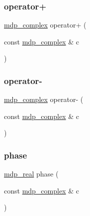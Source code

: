 \mbox{\label{classmdp__complex_addd8f88607b984dd6642d8f6785d2d5c}} 
\subsubsection{\texorpdfstring{operator+}{operator+}}
{\footnotesize\ttfamily \hyperlink{classmdp__complex}{mdp\+\_\+complex} operator+ (\begin{DoxyParamCaption}\item[{const \hyperlink{classmdp__complex}{mdp\+\_\+complex} \&}]{c }\end{DoxyParamCaption})\hspace{0.3cm}{\ttfamily [friend]}}

\mbox{\label{classmdp__complex_a9dbd08dfce91bbc62f7e1b2926a63dcd}} 
\subsubsection{\texorpdfstring{operator-\/}{operator-}}
{\footnotesize\ttfamily \hyperlink{classmdp__complex}{mdp\+\_\+complex} operator-\/ (\begin{DoxyParamCaption}\item[{const \hyperlink{classmdp__complex}{mdp\+\_\+complex} \&}]{c }\end{DoxyParamCaption})\hspace{0.3cm}{\ttfamily [friend]}}

\mbox{\label{classmdp__complex_a54c5a00e1f1f36c105a4587431fd2dab}} 
\subsubsection{\texorpdfstring{phase}{phase}}
{\footnotesize\ttfamily \hyperlink{mdp__global__vars_8h_a69d96b74c791e0bbdb888b3913a69450}{mdp\+\_\+real} phase (\begin{DoxyParamCaption}\item[{const \hyperlink{classmdp__complex}{mdp\+\_\+complex} \&}]{c }\end{DoxyParamCaption})\hspace{0.3cm}{\ttfamily [friend]}}

